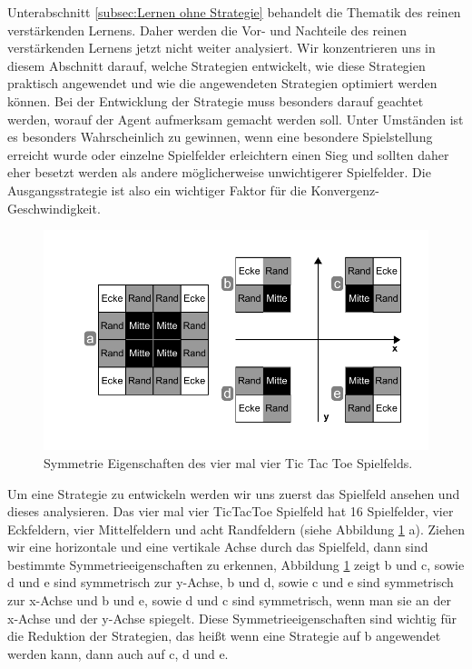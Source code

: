 Unterabschnitt \ref{subsec:Lernen ohne Strategie} behandelt die Thematik des reinen verstärkenden Lernens. Daher werden die Vor- und Nachteile des reinen verstärkenden Lernens jetzt nicht weiter analysiert. Wir konzentrieren uns in diesem Abschnitt darauf, welche Strategien entwickelt, wie diese Strategien praktisch angewendet und wie die angewendeten Strategien optimiert werden können. Bei der Entwicklung der Strategie muss besonders darauf geachtet werden, worauf der Agent aufmerksam gemacht werden soll. Unter Umständen ist es besonders Wahrscheinlich zu gewinnen, wenn eine besondere Spielstellung erreicht wurde oder  einzelne Spielfelder erleichtern einen Sieg und sollten daher eher besetzt werden als andere möglicherweise unwichtigerer Spielfelder. Die Ausgangsstrategie ist also ein wichtiger Faktor für die Konvergenz-Geschwindigkeit.


\begin{figure}[!htbp]
  \centering
  \includegraphics[scale = 1]{inhalt/abbildungen/symmetrie_tictactoe_spielfeld.pdf}
  \caption{Symmetrie Eigenschaften des vier mal vier Tic Tac Toe Spielfelds.}
  \label{fig:symmetrie_tictactoe_spielfeld}
\end{figure}

Um eine Strategie zu entwickeln werden wir uns zuerst das Spielfeld ansehen und dieses analysieren. Das vier mal vier TicTacToe Spielfeld hat 16 Spielfelder, vier Eckfeldern, vier Mittelfeldern und acht Randfeldern (siehe Abbildung \ref{fig:symmetrie_tictactoe_spielfeld} a). Ziehen wir eine horizontale und eine vertikale Achse durch das Spielfeld, dann sind bestimmte Symmetrieeigenschaften zu erkennen, Abbildung \ref{fig:symmetrie_tictactoe_spielfeld} zeigt b und c, sowie d und e sind symmetrisch zur y-Achse, b und d, sowie c und e sind symmetrisch zur x-Achse und b und e, sowie d und c sind symmetrisch, wenn man sie an der x-Achse und der y-Achse spiegelt. Diese Symmetrieeigenschaften sind wichtig für die Reduktion der Strategien, das heißt wenn eine Strategie auf b angewendet werden kann, dann auch auf c, d und e.

